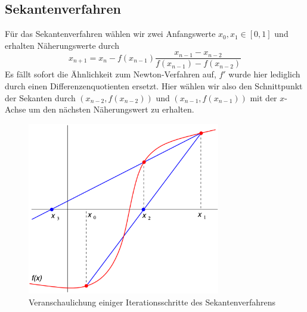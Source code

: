 \documentclass[a4paper,12pt]{article}
\newcommand{\1}{1\hspace{-0,9ex}1}
\begin{document}
\subsection*{Sekantenverfahren}
Für das Sekantenverfahren wählen wir zwei Anfangswerte $x_0,x_1 \in [0,1]$ und erhalten Näherungswerte durch
\[
	x_{n+1}= x_n - f(x_{n-1})\frac{x_{n-1}-x_{n-2}}{f(x_{n-1})-f(x_{n-2})}
\]
Es fällt sofort die Ähnlichkeit zum Newton-Verfahren auf, $f'$ wurde hier lediglich durch einen Differenzenquotienten ersetzt. Hier wählen wir also den Schnittpunkt der Sekanten durch $(x_{n-2}, f(x_{n-2}))$ und $(x_{n-1}, f(x_{n-1}))$ mit der $x$-Achse um den nächsten Näherungswert zu erhalten.
\begin{figure}[!h]
	\centering
	\includegraphics[width=0.75\textwidth]{plots/sekant.png}
	\caption{Veranschaulichung einiger Iterationsschritte des Sekantenverfahrens}
\end{figure}
\end{document}
